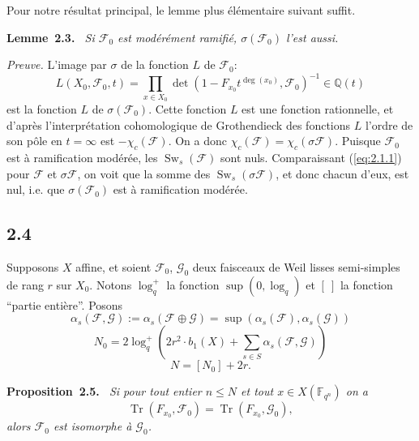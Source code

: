 \documentclass[10pt,a4paper]{article}
\makeatletter
\theoremstyle{plain}
\theoremstyle{definition}
\newenvironment{manualblock}[4]{%
  \par\medskip\noindent\textbf{#1~#2#3.}\def\@currentlabel{#2}\label{#4}\itshape\ }{\par\normalfont\medskip}
\DeclareMathOperator{\Sw}{Sw}
\DeclareMathOperator{\tr}{Tr}
\makeatother
\begin{document}
Pour notre r\'esultat principal, le lemme plus \'el\'ementaire suivant suffit.

\begin{manualblock}{Lemme}{2.3}{}{lem:2.3}
Si $\mathcal{F}_0$ est mod\'er\'ement ramifi\'e, $\sigma(\mathcal{F}_0)$ l'est aussi.
\end{manualblock}

\noindent\textit{Preuve.} L'image par $\sigma$ de la fonction $L$ de $\mathcal{F}_0$:
\[
L(X_0, \mathcal{F}_0, t) = \prod_{x \in X_0} \det(1 - F_{x_0} t^{\deg(x_0)}, \mathcal{F}_0)^{-1} \in \mathbb{Q}(t)
\]
est la fonction $L$ de $\sigma(\mathcal{F}_0)$. Cette fonction $L$ est une fonction rationnelle, et d'apr\`es l'interpr\'etation cohomologique de Grothendieck des fonctions $L$ l'ordre de son p\^ole en $t = \infty$ est $-\chi_c(\mathcal{F})$. On a donc $\chi_c(\mathcal{F}) = \chi_c(\sigma \mathcal{F})$. Puisque $\mathcal{F}_0$ est \`a ramification mod\'er\'ee, les $\Sw_s(\mathcal{F})$ sont nuls. Comparaissant (\ref{eq:2.1.1}) pour $\mathcal{F}$ et $\sigma \mathcal{F}$, on voit que la somme des $\Sw_s(\sigma \mathcal{F})$, et donc chacun d'eux, est nul, i.e. que $\sigma(\mathcal{F}_0)$ est \`a ramification mod\'er\'ee.

\subsection*{2.4}

Supposons $X$ affine, et soient $\mathcal{F}_0$, $\mathcal{G}_0$ deux faisceaux de Weil lisses semi-simples de rang $r$ sur $X_0$. Notons $\log_q^+$ la fonction $\sup(0, \log_q)$ et $[\ ]$ la fonction ``partie enti\`ere''. Posons
\begin{equation}\label{eq:2.4.1}
\alpha_s(\mathcal{F}, \mathcal{G}) := \alpha_s(\mathcal{F} \oplus \mathcal{G}) = \sup(\alpha_s(\mathcal{F}), \alpha_s(\mathcal{G}))
\end{equation}
\begin{equation}\label{eq:2.4.2}
N_0 = 2\log_q^+\left(2r^2 \cdot b_1(X) + \sum_{s \in S} \alpha_s(\mathcal{F}, \mathcal{G})\right)
\end{equation}
\begin{equation}\label{eq:2.4.3}
N = [N_0] + 2r.
\end{equation}

\begin{manualblock}{Proposition}{2.5}{}{prop:2.5}
Si pour tout entier $n \leq N$ et tout $x \in X(\mathbb{F}_{q^n})$ on a
\[
\tr(F_{x_0}, \mathcal{F}_0) = \tr(F_{x_0}, \mathcal{G}_0),
\]
alors $\mathcal{F}_0$ est isomorphe \`a $\mathcal{G}_0$.
\end{manualblock}
\end{document}
